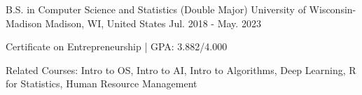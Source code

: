 

\begin{cventries}

  \cventry
  {B.S. in Computer Science and Statistics (Double Major)} %
  {University of Wisconsin-Madison} %
  {Madison, WI, United States} %
  {Jul. 2018 - May. 2023} %
  {
    \begin{cvitems} %
      \item {Certificate on Entrepreneurship | GPA: 3.882/4.000}
      \item {Related Courses: Intro to OS, Intro to AI, Intro to Algorithms, Deep Learning, R for Statistics, Human Resource Management}
    \end{cvitems}
  }

\end{cventries}
